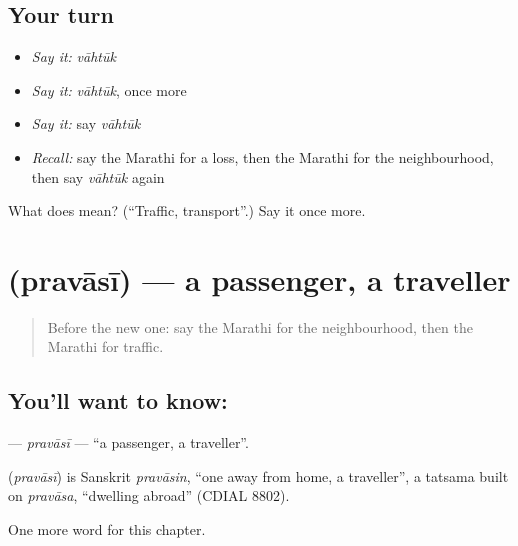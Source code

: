 \subsection*{Your turn}
\begin{itemize}
\raggedright
  \item \emph{Say it:} \emph{vāhtūk}
  \item \emph{Say it:} \emph{vāhtūk}, once more
  \item \emph{Say it:} say \emph{vāhtūk}
  \item \emph{Recall:} say the Marathi for a loss, then the Marathi for the neighbourhood, then say \emph{vāhtūk} again
\end{itemize}

\begin{tcolorbox}[breakable,colback=teal!4,colframe=teal!35!black,title={Before you move on}]
What does  mean? (\textquotedblleft{}Traffic, transport\textquotedblright{}.) Say it once more.
\end{tcolorbox}
\section[\texorpdfstring{\mr{प्रवासी} (pravāsī)}{प्रवासी (pravāsī)}]{ (pravāsī) — a passenger, a traveller}

\label{lesson:MR-C190-pravasi}



\begin{quote}
Before the new one: say the Marathi for the neighbourhood, then the Marathi for traffic.
\end{quote}

\subsection*{You'll want to know: }
\textbf{} — \emph{pravāsī} — \textquotedblleft{}a passenger, a traveller\textquotedblright{}.

\begin{cousinweb}
\textbf{} (\emph{pravāsī}) is Sanskrit \emph{pravāsin}, \textquotedblleft{}one away from home, a traveller\textquotedblright{}, a tatsama built on \emph{pravāsa}, \textquotedblleft{}dwelling abroad\textquotedblright{} (CDIAL 8802).
\end{cousinweb}

\begin{grammarlens}[title={What you've built}]
One more word for this chapter.
\end{grammarlens}


